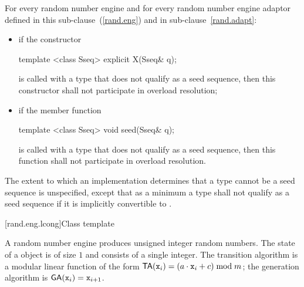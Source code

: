 \pnum
For every random number engine and for every random number engine adaptor 
defined in this sub-clause~(\ref{rand.eng}) and in sub-clause~\ref{rand.adapt}:

\begin{itemize}
\item
if the constructor
\begin{codeblock}
template <class Sseq> explicit X(Sseq& q);
\end{codeblock}
is called with a type  that does not qualify as a seed sequence, then this
constructor shall not participate in overload resolution;

\item
if the member function
\begin{codeblock}
template <class Sseq> void seed(Sseq& q);
\end{codeblock}
is called with a type  that does not qualify as a seed sequence, then this
function shall not participate in overload resolution.
\end{itemize}

The extent to which an implementation determines that a type cannot be a seed sequence
is unspecified, except that as a minimum a type shall not qualify as a seed sequence
if it is implicitly convertible to .


[rand.eng.lcong]{Class template }%
%

\pnum
A  random number engine
produces unsigned integer random numbers.
The state%
of a  object 
is of size $1$
and consists of a single integer.
The transition algorithm%
%
is a modular linear function of the form
$\mathsf{TA}(\texttt{x}_{i}) = (a \cdot \texttt{x}_{i} + c) \bmod m$;
the generation algorithm%
%
is $ \mathsf{GA}(\texttt{x}_{i}) = \texttt{x}_{i+1} $.

